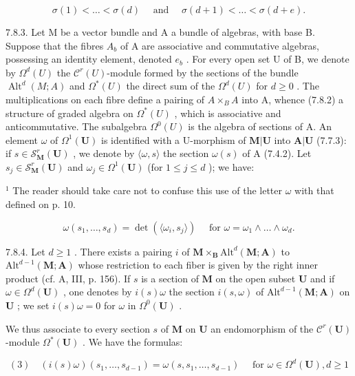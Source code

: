 \[
\sigma (1) <   \dots <   \sigma (d) \quad \text { and } \quad \sigma (d + 1) <   \dots <   \sigma (d + e).
\]

7.8.3. Let M be a vector bundle and A a bundle of algebras, with base B. Suppose that the fibres \(A_{b}\) of A are associative and commutative algebras, possessing an identity element, denoted \(e_{b}\) . For every open set U of B, we denote by \(\Omega^{d}(U)\) the \(\mathcal{C}^{r}(U)\)-module formed by the sections of the bundle \(\operatorname{Alt}^{d}(M;A)\) and \(\Omega^{*}(U)\) the direct sum of the \(\Omega^{d}(U)\) for \(d\geqslant0\) . The multiplications on each fibre define a pairing of \(A\times_{B}A\) into A, whence (7.8.2) a structure of graded algebra on \(\Omega^{*}(U)\) , which is associative and anticommutative. The subalgebra \(\Omega^{0}(U)\) is the algebra of sections of A. An element \(\omega\) of \(\Omega^{1}(\mathbf{U})\) is identified with a U-morphism of \(\mathbf{M}|\mathbf{U}\) into \(\mathbf{A}|\mathbf{U}\) (7.7.3): if \(s\in\mathcal{S}_{\mathbf{M}}^{r}(\mathbf{U})\) , we denote by \(\langle\omega,s\rangle\) the section \(\omega(s)\) of A (7.4.2). Let \(s_{j}\in\mathcal{S}_{\mathbf{M}}^{r}(\mathbf{U})\) and \(\omega_{j}\in\Omega^{1}(\mathbf{U})\) (for \(1\leqslant j\leqslant d\) ); we have:

\(^{1}\) The reader should take care not to confuse this use of the letter \(\omega\) with that defined on p. 10.

\[
\omega (s _ {1}, \dots , s _ {d}) = \det (\langle \omega_ {i}, s _ {j} \rangle) \quad \text {   for   } \omega = \omega_ {1} \wedge \dots \wedge \omega_ {d}.\tag{2}
\]

7.8.4. Let \(d \geqslant 1\) . There exists a pairing \(i\) of \(\mathbf{M} \times_{\mathbf{B}} \mathrm{Alt}^{d}(\mathbf{M}; \mathbf{A})\) to \(\mathrm{Alt}^{d-1}(\mathbf{M}; \mathbf{A})\) whose restriction to each fiber is given by the right inner product (cf. A, III, p. 156). If \(s\) is a section of \(\mathbf{M}\) on the open subset \(\mathbf{U}\) and if \(\omega \in \Omega^{d}(\mathbf{U})\) , one denotes by \(i(s)\omega\) the section \(i(s, \omega)\) of \(\mathrm{Alt}^{d-1}(\mathbf{M}; \mathbf{A})\) on \(\mathbf{U}\) ; we set \(i(s)\omega = 0\) for \(\omega\) in \(\Omega^{0}(\mathbf{U})\) .

We thus associate to every section \(s\) of \(\mathbf{M}\) on \(\mathbf{U}\) an endomorphism of the \(\mathcal{C}^r (\mathbf{U})\)-module \(\Omega^{*}(\mathbf{U})\) . We have the formulas:

\[
(3) \quad (i (s) \omega) (s _ {1}, \dots , s _ {d - 1}) = \omega (s, s _ {1}, \dots , s _ {d - 1}) \quad \text { for } \omega \in \Omega^ {d} (\mathbf {U}), d \geqslant 1
\]

